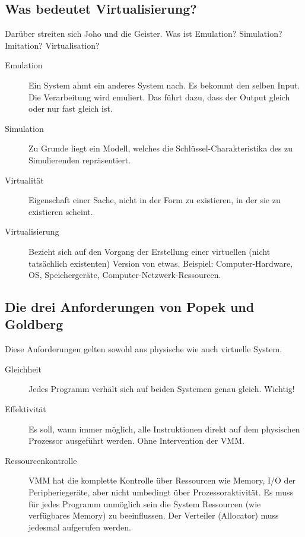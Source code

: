 \subsection{Was bedeutet Virtualisierung?}
\label{sec:was-bedeutet-virtualisierung}
Darüber streiten sich Joho und die Geister. Was ist Emulation? Simulation? Imitation?  Virtualisation?
\begin{description}
	\item[Emulation] Ein System ahmt ein anderes System nach. Es bekommt den selben Input. Die Verarbeitung wird emuliert. Das führt dazu, dass der Output gleich oder nur fast gleich ist.
	\item[Simulation] Zu Grunde liegt ein Modell, welches die Schlüssel-Charakteristika des zu Simulierenden repräsentiert.
	\item[Virtualität] Eigenschaft einer Sache, nicht in der Form zu existieren, in der sie zu existieren scheint.
	\item[Virtualisierung] Bezieht sich auf den Vorgang der Erstellung einer virtuellen (nicht tatsächlich existenten) Version von etwas. Beispiel: Computer-Hardware, OS, Speichergeräte, Computer-Netzwerk-Ressourcen. 
\end{description}

\subsection{Die drei Anforderungen von Popek und Goldberg}
\label{sec:popek-goldberg-anforderungen}
Diese Anforderungen gelten sowohl ans physische wie auch virtuelle System.
\begin{description}
	\item[Gleichheit] Jedes Programm verhält sich auf beiden Systemen genau gleich. Wichtig!
	\item[Effektivität] Es soll, wann immer möglich, alle Instruktionen direkt auf dem physischen Prozessor ausgeführt werden. Ohne Intervention der VMM.
	\item[Ressourcenkontrolle] VMM hat die komplette Kontrolle über Ressourcen wie Memory, I/O der Peripheriegeräte, aber nicht umbedingt über Prozessoraktivität. Es muss für jedes Programm unmöglich sein die System Ressourcen (wie verfügbares Memory) zu beeinflussen. Der Verteiler (Allocator) muss jedesmal aufgerufen werden.
\end{description}

